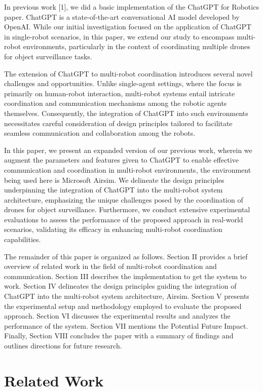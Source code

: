\documentclass[journal]{IEEEtran}
\begin{document}
In previous work [1], we did a basic implementation of the ChatGPT for Robotics paper. ChatGPT is a state-of-the-art conversational AI model developed by OpenAI. While our initial investigation focused on the application of ChatGPT in single-robot scenarios, in this paper, we extend our study to encompass multi-robot environments, particularly in the context of coordinating multiple drones for object surveillance tasks.

The extension of ChatGPT to multi-robot coordination introduces several novel challenges and opportunities. Unlike single-agent settings, where the focus is primarily on human-robot interaction, multi-robot systems entail intricate coordination and communication mechanisms among the robotic agents themselves. Consequently, the integration of ChatGPT into such environments necessitates careful consideration of design principles tailored to facilitate seamless communication and collaboration among the robots.

In this paper, we present an expanded version of our previous work, wherein we augment the parameters and features given to ChatGPT to enable effective communication and coordination in multi-robot environments, the environment being used here is Microsoft Airsim. We delineate the design principles underpinning the integration of ChatGPT into the multi-robot system architecture, emphasizing the unique challenges posed by the coordination of drones for object surveillance. Furthermore, we conduct extensive experimental evaluations to assess the performance of the proposed approach in real-world scenarios, validating its efficacy in enhancing multi-robot coordination capabilities.

The remainder of this paper is organized as follows. Section II provides a brief overview of related work in the field of multi-robot coordination and communication. Section III describes the implementation to get the system to work. Section IV delineates the design principles guiding the integration of ChatGPT into the multi-robot system architecture, Airsim. Section V presents the experimental setup and methodology employed to evaluate the proposed approach. Section VI discusses the experimental results and analyzes the performance of the system. Section VII mentions the Potential Future Impact. Finally, Section VIII concludes the paper with a summary of findings and outlines directions for future research.




\section{Related Work}
\end{document}
